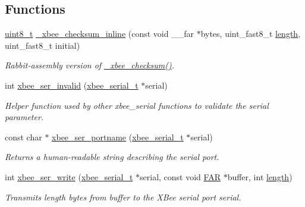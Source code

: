 \subsection*{Functions}
\begin{DoxyCompactItemize}
\item 
\hyperlink{group__hal__dos_gae1affc9ca37cfb624959c866a73f83c2}{uint8\+\_\+t} \hyperlink{group__hal__rabbit_ga02da89986736815045b1a11e1c58733e}{\+\_\+xbee\+\_\+checksum\+\_\+inline} (const void \+\_\+\+\_\+far $\ast$bytes, uint\+\_\+fast8\+\_\+t \hyperlink{group__zdo_gab2b3adeb2a67e656ff030b56727fd0ac}{length}, uint\+\_\+fast8\+\_\+t initial)
\begin{DoxyCompactList}\small\item\em Rabbit-\/assembly version of \hyperlink{group__xbee__device_gae8a32665036083d3a236fcde4359cc79}{\+\_\+xbee\+\_\+checksum()}. \end{DoxyCompactList}\item 
int \hyperlink{group__hal__rabbit_ga3c79f6b72b6cfc3cc5c4524450f661b9}{xbee\+\_\+ser\+\_\+invalid} (\hyperlink{structxbee__serial__t}{xbee\+\_\+serial\+\_\+t} $\ast$serial)
\begin{DoxyCompactList}\small\item\em Helper function used by other xbee\+\_\+serial functions to validate the {\itshape serial} parameter. \end{DoxyCompactList}\item 
const char $\ast$ \hyperlink{group__hal__rabbit_ga898057d1b7645785e7f3d6256828d039}{xbee\+\_\+ser\+\_\+portname} (\hyperlink{structxbee__serial__t}{xbee\+\_\+serial\+\_\+t} $\ast$serial)
\begin{DoxyCompactList}\small\item\em Returns a human-\/readable string describing the serial port. \end{DoxyCompactList}\item 
int \hyperlink{group__hal__rabbit_ga2ca4e60c9d642084afa52dff9e1f6be4}{xbee\+\_\+ser\+\_\+write} (\hyperlink{structxbee__serial__t}{xbee\+\_\+serial\+\_\+t} $\ast$serial, const void \hyperlink{group__hal_gaef060b3456fdcc093a7210a762d5f2ed}{F\+AR} $\ast$buffer, int \hyperlink{group__zdo_gab2b3adeb2a67e656ff030b56727fd0ac}{length})
\begin{DoxyCompactList}\small\item\em Transmits {\itshape length} bytes from {\itshape buffer} to the X\+Bee serial port {\itshape serial}. \end{DoxyCompactList}\item 

\end{DoxyCompactItemize}
